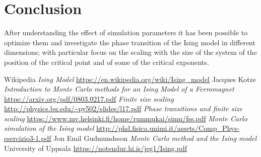 \documentclass[a4paper, 11pt]{article}
\begin{document}
  \section{Conclusion}
    After understanding the effect of simulation parameters it has been possible to optimize them and investigate the phase transition of the Ising model in different dimensions; with particular focus on the scaling with the size of the system of the position of the critical point and of some of the critical exponents.


































  \begin{thebibliography}{100}
     Wikipedia \emph{Ising Model} \url{https://en.wikipedia.org/wiki/Ising_model}
     Jacques Kotze \emph{Introduction to Monte Carlo methods for an Ising Model of a Ferromagnet} \url{https://arxiv.org/pdf/0803.0217.pdf}
     \emph{Finite size scaling} \url{http://physics.bu.edu/~py502/slides/l17.pdf}
     \emph{Phase transitions and finite size scaling} \url{https://www.mv.helsinki.fi/home/rummukai/simu/fss.pdf}
     \emph{Monte Carlo simulation of the Ising model} \url{http://phd.fisica.unimi.it/assets/Comp_Phys-esercizio3-1.pdf}
     Jon Emil Gudmundsson \emph{Monte Carlo method and the Ising model} University of Uppsala \url{https://notendur.hi.is/jeg1/Ising.pdf}

  \end{thebibliography}
\end{document}
